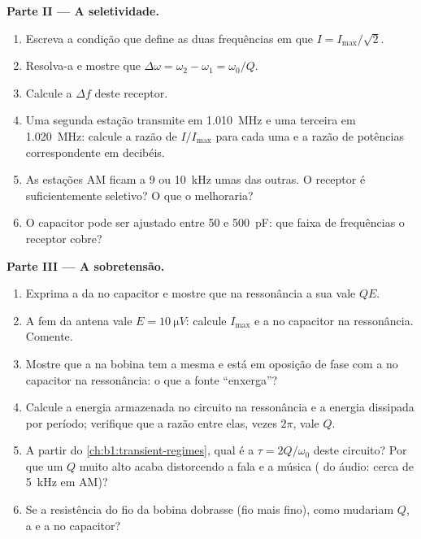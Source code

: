 \begin{problem}
\medskip
\noindent\textbf{Parte II --- A seletividade.}
\begin{enumerate}[resume]
  \item Escreva a condição que define as duas frequências em que
        $I = I_{\max}/\sqrt2$.
  \item Resolva-a e mostre que $\Delta\omega = \omega_2 - \omega_1 =
        \omega_0/Q$.
  \item Calcule a  $\Delta f$ deste receptor.
  \item Uma segunda estação transmite em \qty{1.010}{MHz} e uma terceira em
        \qty{1.020}{MHz}: calcule a razão de  $I/I_{\max}$ para
        cada uma e a razão de potências correspondente em decibéis.
  \item As estações AM ficam a \qty{9}{} ou \qty{10}{kHz} umas das outras. O
        receptor é suficientemente seletivo? O que o melhoraria?
  \item O capacitor pode ser ajustado entre \qty{50}{} e \qty{500}{pF}:
        que faixa de frequências o receptor cobre?
\end{enumerate}

\medskip
\noindent\textbf{Parte III --- A sobretensão.}
\begin{enumerate}[resume]
  \item Exprima a  da  no capacitor e mostre
        que na ressonância a sua  vale $QE$.
  \item A fem da antena vale $E = \qty{10}{\micro V}$: calcule $I_{\max}$
        e a  no capacitor na ressonância. Comente.
  \item Mostre que a  na bobina tem a mesma  e está em
        oposição de fase com a  no capacitor na ressonância: o que
        a fonte ``enxerga''?
  \item Calcule a energia armazenada no circuito na ressonância e a
        energia dissipada por período; verifique que a razão entre elas, vezes
        $2\pi$, vale $Q$.
  \item A partir do \cref{ch:b1:transient-regimes}, qual é a 
        $\tau = 2Q/\omega_0$ deste circuito? Por que um $Q$ muito alto
        acaba distorcendo a fala e a música ( do áudio:
        cerca de \qty{5}{kHz} em AM)?
  \item Se a resistência do fio da bobina dobrasse (fio mais fino), como
        mudariam $Q$, a  e a  no capacitor?
\end{enumerate}


\end{problem}
